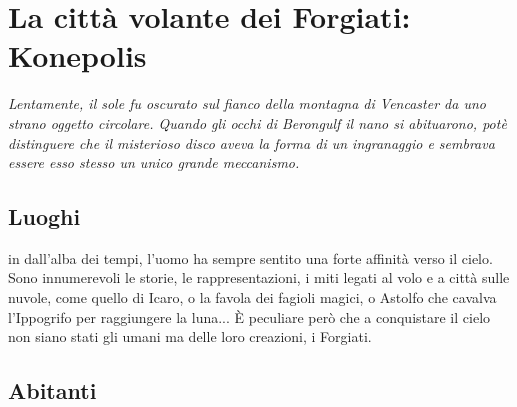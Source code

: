 \chapter{La città volante dei Forgiati: Konepolis}

\begin{DndReadAloud}
    \it
    Lentamente, il sole fu oscurato sul fianco della montagna di Vencaster da uno strano oggetto circolare. Quando gli occhi di Berongulf il nano si abituarono, potè distinguere che il misterioso disco aveva la forma di un ingranaggio e sembrava essere esso stesso un unico grande meccanismo.
\end{DndReadAloud}

\section{Luoghi}

in dall'alba dei tempi, l'uomo ha sempre sentito una forte affinità verso il cielo. Sono innumerevoli le storie, le rappresentazioni, i miti legati al volo e a città sulle nuvole, come quello di Icaro, o la favola dei fagioli magici, o Astolfo che cavalva l'Ippogrifo per raggiungere la luna... È peculiare però che a conquistare il cielo non siano stati gli umani ma delle loro creazioni, i Forgiati.

\section{Abitanti}